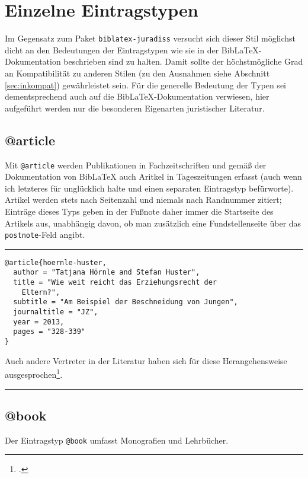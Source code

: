 \documentclass[11pt,a4paper,DIV=calc,draft]{scrartcl}
\newcommand\software[1]{\textsf{#1}}
\newcommand\Biblatex{\software{Bib\LaTeX{}}\xspace}
\newenvironment{rubexample}{\par\vspace{\baselineskip}\hrule\par\begin{refsection}}{\end{refsection}\par\hrule\par\vspace{\baselineskip}}
\begin{document}
\section{Einzelne Eintragstypen}\label{sec:eintragstypen}

Im Gegensatz zum Paket \verb+biblatex-juradiss+ versucht sich dieser
Stil möglichst dicht an den Bedeutungen der Eintragstypen wie sie in
der \Biblatex-Do\-ku\-men\-ta\-tion beschrieben sind zu halten. Damit sollte
der höchstmögliche Grad an Kompatibilität zu anderen Stilen (zu den
Ausnahmen siehe Abschnitt \ref{sec:inkompat}) gewährleistet sein. Für
die generelle Bedeutung der Typen sei dementsprechend auch auf die
\Biblatex-Do\-ku\-men\-ta\-tion verwiesen, hier aufgeführt werden nur die
besonderen Eigenarten juristischer Literatur.

\subsection{@article}

Mit \verb+@article+ werden Publikationen in Fachzeitschriften und
gemäß der Do\-ku\-men\-ta\-tion von \Biblatex auch Aritkel in
Tageszeitungen erfasst (auch wenn ich letzteres für unglücklich halte
und einen separaten Eintragstyp befürworte). Artikel werden stets nach
Seitenzahl und niemals nach Randnummer zitiert; Einträge dieses Typs
geben in der Fußnote daher immer die Startseite des Artikels aus,
unabhängig davon, ob man zusätzlich eine Fundstellenseite über das
\verb+postnote+-Feld angibt.

\begin{rubexample}
\begin{verbatim}
@article{hoernle-huster,
  author = "Tatjana Hörnle and Stefan Huster",
  title = "Wie weit reicht das Erziehungsrecht der
    Eltern?",
  subtitle = "Am Beispiel der Beschneidung von Jungen",
  journaltitle = "JZ",
  year = 2013,
  pages = "328-339"
}
\end{verbatim}

Auch andere Vertreter in der Literatur haben sich für diese
Herangehensweise ausgesprochen\footcite[330]{hoernle-huster}.

\printbibliography
\end{rubexample}

\subsection{@book}

Der Eintragstyp \verb+@book+ umfasst Monografien und Lehrbücher.
\end{document}
